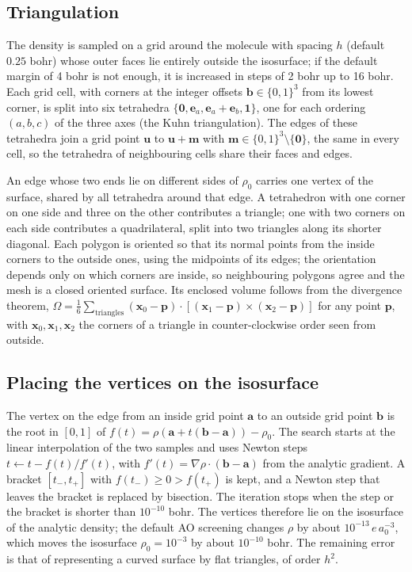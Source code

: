 \documentclass[11pt,a4paper]{article}
\begin{document}
\subsection{Triangulation}
The density is sampled on a grid around the molecule with spacing $h$
(default $0.25$ bohr) whose outer faces lie entirely outside the
isosurface; if the default margin of 4 bohr is not enough, it is increased
in steps of 2 bohr up to 16 bohr. Each grid cell, with corners at the
integer offsets $\mathbf b\in\{0,1\}^3$ from its lowest corner, is split
into six tetrahedra $\{\mathbf 0,\mathbf e_a,\mathbf e_a+\mathbf e_b,\mathbf 1\}$,
one for each ordering $(a,b,c)$ of the three axes (the Kuhn
triangulation). The edges of these tetrahedra join a grid point
$\mathbf u$ to $\mathbf u+\mathbf m$ with $\mathbf m\in\{0,1\}^3\setminus\{\mathbf 0\}$,
the same in every cell, so the tetrahedra of neighbouring cells share their
faces and edges.

An edge whose two ends lie on different sides of $\rho_0$ carries one
vertex of the surface, shared by all tetrahedra around that edge. A
tetrahedron with one corner on one side and three on the other contributes
a triangle; one with two corners on each side contributes a quadrilateral,
split into two triangles along its shorter diagonal. Each polygon is
oriented so that its normal points from the inside corners to the outside
ones, using the midpoints of its edges; the orientation depends only on
which corners are inside, so neighbouring polygons agree and the mesh is a
closed oriented surface. Its enclosed volume follows from the divergence
theorem,
$\Omega=\frac16\sum_{\text{triangles}}(\mathbf x_0-\mathbf p)\cdot
[(\mathbf x_1-\mathbf p)\times(\mathbf x_2-\mathbf p)]$ for any point
$\mathbf p$, with $\mathbf x_0,\mathbf x_1,\mathbf x_2$ the corners of a
triangle in counter-clockwise order seen from outside.

\subsection{Placing the vertices on the isosurface}
The vertex on the edge from an inside grid point $\mathbf a$ to an outside
grid point $\mathbf b$ is the root in $[0,1]$ of
$f(t)=\rho(\mathbf a+t(\mathbf b-\mathbf a))-\rho_0$. The search starts at
the linear interpolation of the two samples and uses Newton steps
$t\leftarrow t-f(t)/f'(t)$, with
$f'(t)=\nabla\rho\cdot(\mathbf b-\mathbf a)$ from the analytic gradient. A
bracket $[t_-,t_+]$ with $f(t_-)\ge0>f(t_+)$ is kept, and a Newton step
that leaves the bracket is replaced by bisection. The iteration stops when
the step or the bracket is shorter than $10^{-10}$ bohr. The vertices
therefore lie on the isosurface of the analytic density; the default AO
screening changes $\rho$ by about $10^{-13}\,e\,a_0^{-3}$, which moves the
isosurface $\rho_0=10^{-3}$ by about $10^{-10}$ bohr. The remaining error
is that of representing a curved surface by flat triangles, of order
$h^2$.
\end{document}
